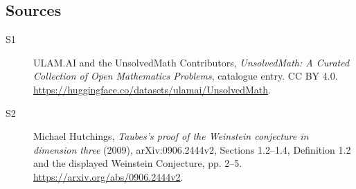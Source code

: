 \documentclass[11pt]{article}
\begin{document}
\subsection{Sources}
\begin{description}
\item[\hypertarget{source:statement:1}{S1}] ULAM.AI and the UnsolvedMath Contributors, \emph{UnsolvedMath: A Curated Collection of Open Mathematics Problems}, catalogue entry. CC BY 4.0. \url{https://huggingface.co/datasets/ulamai/UnsolvedMath}.
\item[\hypertarget{source:statement:2}{S2}] Michael Hutchings, \emph{Taubes's proof of the Weinstein conjecture in dimension three} (2009), arXiv:0906.2444v2, Sections 1.2--1.4, Definition 1.2 and the displayed Weinstein Conjecture, pp. 2--5. \url{https://arxiv.org/abs/0906.2444v2}.
\end{description}
\label{end:statement}
\end{document}

